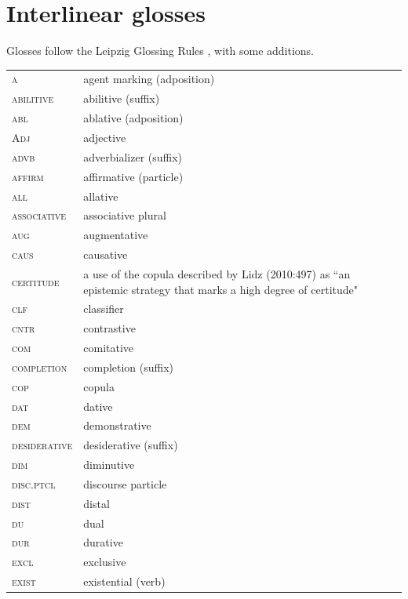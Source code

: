 

	
\section*{Interlinear glosses}
\label{sec:glosses}

Glosses follow the Leipzig Glossing Rules \citep{comrieetal}, with some additions.

\begin{table}[H]
{%
\begin{tabularx}{\textwidth}{ @{}l Q } 
	\textsc{a} & agent marking (adposition)\\
	\textsc{abilitive} & abilitive (suffix)\\
	\textsc{abl} & ablative (adposition)\\
	\textsc{Adj} & adjective\\
	\textsc{advb} & adverbializer (suffix)\\
	\textsc{affirm} & affirmative (particle)\\
	\textsc{all} & allative\\
	\textsc{associative} & associative plural\\
	\textsc{aug} & augmentative\\
	\textsc{caus} & causative\\
	\textsc{certitude} & \parbox[t]{\linewidth}{a use of the copula described by Lidz (2010:497) as ``an epistemic strategy that marks a high degree of certitude"}\\
	\textsc{clf} & classifier\\
	\textsc{cntr} & contrastive\\
	\textsc{com} & comitative\\
	\textsc{completion} & completion (suffix)\\
	\textsc{cop} & copula\\
   \textsc{dat} & dative\\
   \textsc{dem} & demonstrative\\
	\textsc{desiderative} & desiderative (suffix)\\
	\textsc{dim} & diminutive\\
	\textsc{disc.ptcl} & discourse particle\\
	\textsc{dist} & distal\\
	\textsc{du} & dual\\
	\textsc{dur} & durative\\
	\textsc{excl} & exclusive\\
	\textsc{exist} & existential (verb)\\
	\end{tabularx}}
\end{table}

